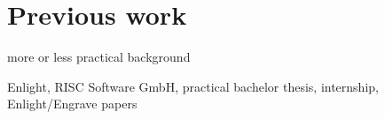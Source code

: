 \chapter{Previous work}

more or less practical background

Enlight, RISC Software GmbH, practical bachelor thesis, internship, Enlight/Engrave papers
